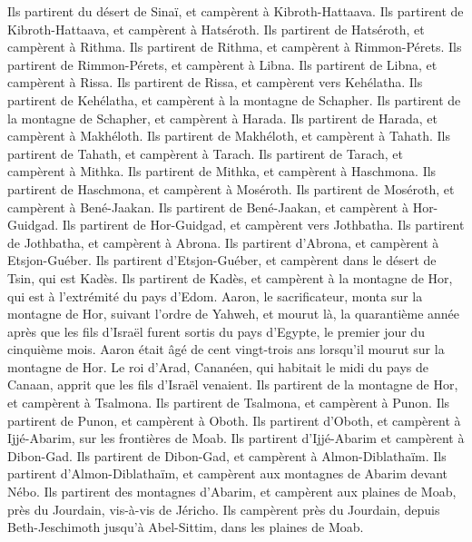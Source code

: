 \begin{multicols}{2}
Ils partirent du désert de Sinaï, et campèrent à Kibroth-Hattaava.
Ils partirent de Kibroth-Hattaava, et campèrent à Hatséroth.
Ils partirent de Hatséroth, et campèrent à Rithma.
Ils partirent de Rithma, et campèrent à Rimmon-Pérets.
Ils partirent de Rimmon-Pérets, et campèrent à Libna.
Ils partirent de Libna, et campèrent à Rissa.
Ils partirent de Rissa, et campèrent vers Kehélatha.
Ils partirent de Kehélatha, et campèrent à la montagne de Schapher.
Ils partirent de la montagne de Schapher, et campèrent à Harada.
Ils partirent de Harada, et campèrent à Makhéloth.
Ils partirent de Makhéloth, et campèrent à Tahath.
Ils partirent de Tahath, et campèrent à Tarach.
Ils partirent de Tarach, et campèrent à Mithka.
Ils partirent de Mithka, et campèrent à Haschmona.
Ils partirent de Haschmona, et campèrent à Moséroth.
Ils partirent de Moséroth, et campèrent à Bené-Jaakan.
Ils partirent de Bené-Jaakan, et campèrent à Hor-Guidgad.
Ils partirent de Hor-Guidgad, et campèrent vers Jothbatha.
Ils partirent de Jothbatha, et campèrent à Abrona.
Ils partirent d'Abrona, et campèrent à Etsjon-Guéber.
Ils partirent d'Etsjon-Guéber, et campèrent dans le désert de Tsin, qui est Kadès.
Ils partirent de Kadès, et campèrent à la montagne de Hor, qui est à l'extrémité du pays d'Edom.
Aaron, le sacrificateur, monta sur la montagne de Hor, suivant l'ordre de Yahweh, et mourut là, la quarantième année après que les fils d'Israël furent sortis du pays d'Egypte, le premier jour du cinquième mois.
Aaron était âgé de cent vingt-trois ans lorsqu'il mourut sur la montagne de Hor.
Le roi d'Arad, Cananéen, qui habitait le midi du pays de Canaan, apprit que les fils d'Israël venaient.
Ils partirent de la montagne de Hor, et campèrent à Tsalmona.
Ils partirent de Tsalmona, et campèrent à Punon.
Ils partirent de Punon, et campèrent à Oboth.
Ils partirent d'Oboth, et campèrent à Ijjé-Abarim, sur les frontières de Moab.
Ils partirent d'Ijjé-Abarim et campèrent à Dibon-Gad.
Ils partirent de Dibon-Gad, et campèrent à Almon-Diblathaïm.
Ils partirent d'Almon-Diblathaïm, et campèrent aux montagnes de Abarim devant Nébo.
Ils partirent des montagnes d'Abarim, et campèrent aux plaines de Moab, près du Jourdain, vis-à-vis de Jéricho.
Ils campèrent près du Jourdain, depuis Beth-Jeschimoth jusqu'à Abel-Sittim, dans les plaines de Moab.

\end{multicols}
